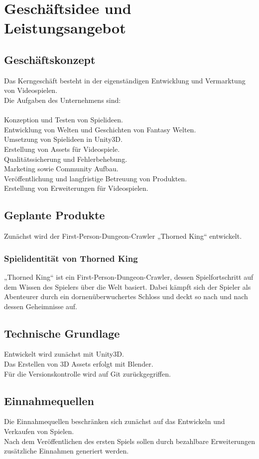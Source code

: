 \documentclass[envcountsame,envcountchap deutsch]{i-studis}
\begin{document}
\chapter{Geschäftsidee und Leistungsangebot}
\section{Geschäftskonzept}
Das Kerngeschäft besteht in der eigenständigen Entwicklung und Vermarktung von Videospielen.\\
Die Aufgaben des Unternehmens sind:\\
\\
Konzeption und Testen von Spielideen. \\
Entwicklung von Welten und Geschichten von Fantasy Welten. \\
Umsetzung von Spielideen in Unity3D.\\
Erstellung von Assets für Videospiele. \\
Qualitätssicherung und Fehlerbehebung. \\
Marketing sowie Community Aufbau. \\
Veröffentlichung und langfristige Betreuung von Produkten. \\
Erstellung von Erweiterungen für Videospielen. \\

\section{Geplante Produkte}
Zunächst wird der First-Person-Dungeon-Crawler „Thorned King“ entwickelt.
\subsection{Spielidentität von Thorned King}
„Thorned King“ ist ein First-Person-Dungeon-Crawler, dessen Spielfortschritt auf dem Wissen des Spielers
über die Welt basiert. Dabei kämpft sich der Spieler als Abenteurer durch ein dornenüberwuchertes Schloss und deckt so nach und nach dessen Geheimnisse auf.

\pagebreak
\section{Technische Grundlage}
Entwickelt wird zunächst mit Unity3D.\\
Das Erstellen von 3D Assets erfolgt mit Blender. \\
Für die Versionskontrolle wird auf Git zurückgegriffen.
\section{Einnahmequellen}
Die Einnahmequellen beschränken sich zunächst auf das Entwickeln und Verkaufen von Spielen.\\
Nach dem Veröffentlichen des ersten Spiels sollen durch bezahlbare Erweiterungen zusätzliche Einnahmen generiert werden.
\end{document}
